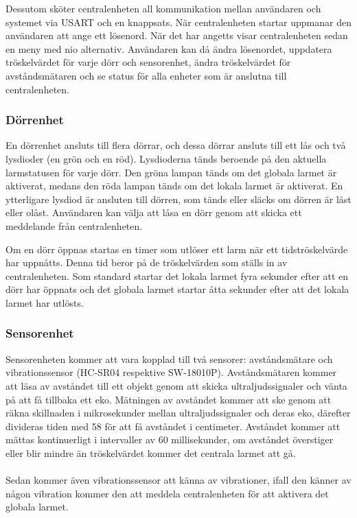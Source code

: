 \documentclass{article}
\begin{document}
Dessutom sköter centralenheten all kommunikation mellan användaren och systemet via USART och en knappsats. När centralenheten startar uppmanar den användaren att ange ett lösenord. När det har angetts visar centralenheten sedan en meny med nio alternativ. Användaren kan då ändra lösenordet, uppdatera tröskelvärdet för varje dörr och sensorenhet, ändra tröskelvärdet för avståndsmätaren och se status för alla enheter som är anslutna till centralenheten.


\subsubsection{Dörrenhet}
En dörrenhet ansluts till flera dörrar, och dessa dörrar ansluts till ett lås och två lysdioder (en grön och en röd). Lysdioderna tänds beroende på den aktuella larmstatusen för varje dörr. Den gröna lampan tänds om det globala larmet är aktiverat, medans den röda lampan tänds om det lokala larmet är aktiverat. En ytterligare lysdiod är ansluten till dörren, som tänds eller släcks om dörren är låst eller olåst. Användaren kan välja att låsa en dörr genom att skicka ett meddelande från centralenheten. 

Om en dörr öppnas startas en timer som utlöser ett larm när ett tidströskelvärde har uppnåtts. Denna tid beror på de tröskelvärden som ställs in av centralenheten. Som standard startar det lokala larmet fyra sekunder efter att en dörr har öppnats och det globala larmet startar åtta sekunder efter att det lokala larmet har utlösts. 

\subsubsection{Sensorenhet}

Sensorenheten kommer att vara kopplad till två sensorer: avståndsmätare och vibrationssensor (HC-SR04 respektive SW-18010P).
Avståndsmätaren kommer att läsa av avståndet till ett objekt genom att skicka ultraljudssignaler och vänta på att få tillbaka ett eko. 
Mätningen av avståndet kommer att ske genom att räkna skillnaden i mikrosekunder mellan ultraljudssignaler och deras eko, därefter divideras tiden med 58 för att få avståndet i centimeter. 
Avståndet kommer att mättas kontinuerligt i intervaller av 60 millisekunder, om avståndet överstiger eller blir mindre än tröskelvärdet kommer det centrala larmet att gå.\\
\\
Sedan kommer även vibrationssensor att känna av vibrationer, ifall den känner av någon vibration kommer den att meddela centralenheten för att aktivera det globala larmet.
\end{document}
